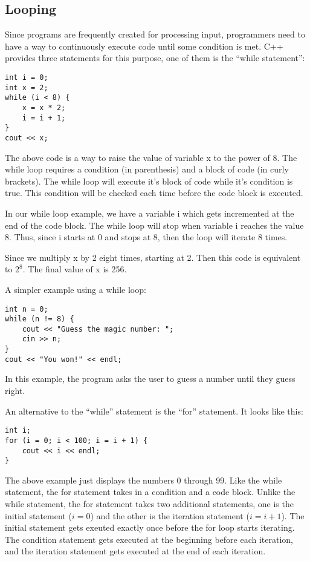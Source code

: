 \documentclass[a4paper,12pt]{article}
\begin{document}
\subsection*{Looping}

Since programs are frequently created for processing input, programmers need to have a way to continuously execute code until some condition is met. C++ provides three statements for this purpose, one of them is the ``while statement'':

\begin{lstlisting}
int i = 0;
int x = 2;
while (i < 8) {
	x = x * 2;
	i = i + 1;
}
cout << x;
\end{lstlisting}

The above code is a way to raise the value of variable x to the power of 8. The while loop requires a condition (in parenthesis) and a block of code (in curly brackets). The while loop will execute it's block of code while it's condition is true. This condition will be checked each time before the code block is executed.

In our while loop example, we have a variable i which gets incremented at the end of the code block. The while loop will stop when variable i reaches the value 8. Thus, since i starts at 0 and stops at 8, then the loop will iterate 8 times.

Since we multiply x by 2 eight times, starting at 2. Then this code is equivalent to $2^8$. The final value of x is 256.

A simpler example using a while loop:

\begin{lstlisting}
int n = 0;
while (n != 8) {
	cout << "Guess the magic number: ";
	cin >> n;
}
cout << "You won!" << endl;
\end{lstlisting}

In this example, the program asks the user to guess a number until they guess right.

An alternative to the ``while'' statement is the ``for'' statement. It looks like this:

\begin{lstlisting}
int i;
for (i = 0; i < 100; i = i + 1) {
	cout << i << endl;	
}
\end{lstlisting}

The above example just displays the numbers 0 through 99. Like the while statement, the for statement takes in a condition and a code block. Unlike the while statement, the for statement takes two additional statements, one is the initial statement ($i = 0$) and the other is the iteration statement ($i = i + 1$). The initial statement gets exeuted exactly once before the for loop starts iterating. The condition statement gets executed at the beginning before each iteration, and the iteration statement gets executed at the end of each iteration.
\end{document}

